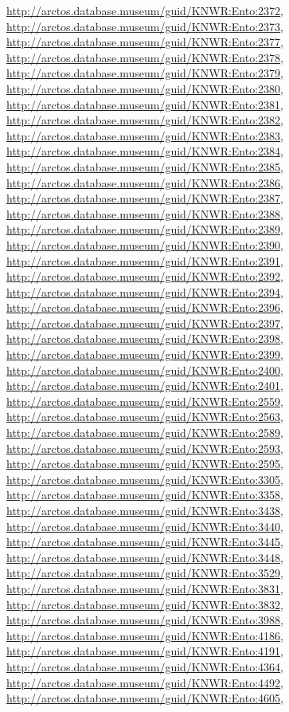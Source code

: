 \documentclass[9pt, article]{memoir}
\begin{document}
\begin{multicols}{2}
\url{http://arctos.database.museum/guid/KNWR:Ento:2372}, 
\url{http://arctos.database.museum/guid/KNWR:Ento:2373}, 
\url{http://arctos.database.museum/guid/KNWR:Ento:2377}, 
\url{http://arctos.database.museum/guid/KNWR:Ento:2378}, 
\url{http://arctos.database.museum/guid/KNWR:Ento:2379}, 
\url{http://arctos.database.museum/guid/KNWR:Ento:2380}, 
\url{http://arctos.database.museum/guid/KNWR:Ento:2381}, 
\url{http://arctos.database.museum/guid/KNWR:Ento:2382}, 
\url{http://arctos.database.museum/guid/KNWR:Ento:2383}, 
\url{http://arctos.database.museum/guid/KNWR:Ento:2384}, 
\url{http://arctos.database.museum/guid/KNWR:Ento:2385}, 
\url{http://arctos.database.museum/guid/KNWR:Ento:2386}, 
\url{http://arctos.database.museum/guid/KNWR:Ento:2387}, 
\url{http://arctos.database.museum/guid/KNWR:Ento:2388}, 
\url{http://arctos.database.museum/guid/KNWR:Ento:2389}, 
\url{http://arctos.database.museum/guid/KNWR:Ento:2390}, 
\url{http://arctos.database.museum/guid/KNWR:Ento:2391}, 
\url{http://arctos.database.museum/guid/KNWR:Ento:2392}, 
\url{http://arctos.database.museum/guid/KNWR:Ento:2394}, 
\url{http://arctos.database.museum/guid/KNWR:Ento:2396}, 
\url{http://arctos.database.museum/guid/KNWR:Ento:2397}, 
\url{http://arctos.database.museum/guid/KNWR:Ento:2398}, 
\url{http://arctos.database.museum/guid/KNWR:Ento:2399}, 
\url{http://arctos.database.museum/guid/KNWR:Ento:2400}, 
\url{http://arctos.database.museum/guid/KNWR:Ento:2401}, 
\url{http://arctos.database.museum/guid/KNWR:Ento:2559}, 
\url{http://arctos.database.museum/guid/KNWR:Ento:2563}, 
\url{http://arctos.database.museum/guid/KNWR:Ento:2589}, 
\url{http://arctos.database.museum/guid/KNWR:Ento:2593}, 
\url{http://arctos.database.museum/guid/KNWR:Ento:2595}, 
\url{http://arctos.database.museum/guid/KNWR:Ento:3305}, 
\url{http://arctos.database.museum/guid/KNWR:Ento:3358}, 
\url{http://arctos.database.museum/guid/KNWR:Ento:3438}, 
\url{http://arctos.database.museum/guid/KNWR:Ento:3440}, 
\url{http://arctos.database.museum/guid/KNWR:Ento:3445}, 
\url{http://arctos.database.museum/guid/KNWR:Ento:3448}, 
\url{http://arctos.database.museum/guid/KNWR:Ento:3529}, 
\url{http://arctos.database.museum/guid/KNWR:Ento:3831}, 
\url{http://arctos.database.museum/guid/KNWR:Ento:3832}, 
\url{http://arctos.database.museum/guid/KNWR:Ento:3988}, 
\url{http://arctos.database.museum/guid/KNWR:Ento:4186}, 
\url{http://arctos.database.museum/guid/KNWR:Ento:4191}, 
\url{http://arctos.database.museum/guid/KNWR:Ento:4364}, 
\url{http://arctos.database.museum/guid/KNWR:Ento:4492}, 
\url{http://arctos.database.museum/guid/KNWR:Ento:4605}, 

\end{multicols}
\end{document}
